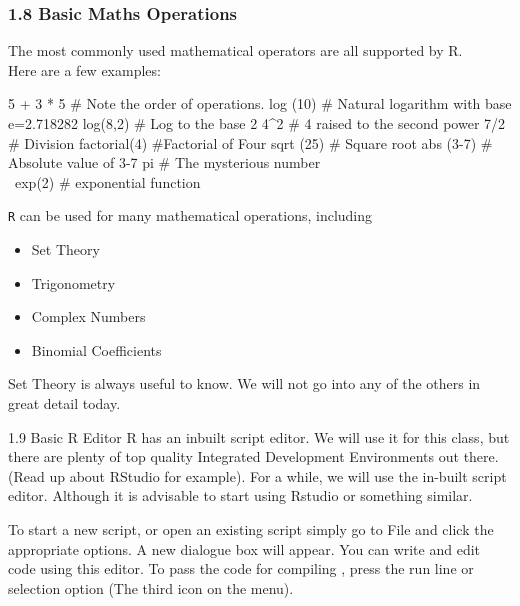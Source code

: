  
 \frametitle{1.8 Basic Maths Operations}
 The most commonly used mathematical operators are all supported by R. \\Here are a few
 examples:
 
 \begin{semiverbatim}
 5 + 3 * 5 # Note the order of operations.
 log (10) # Natural logarithm with base e=2.718282
 log(8,2) # Log to the base 2
 4^2 # 4 raised to the second power
 7/2 # Division
 factorial(4) #Factorial of Four
 sqrt (25) # Square root
 abs (3-7) # Absolute value of 3-7
 pi # The mysterious number \\\
 exp(2) # exponential function
 \end{semiverbatim}
 
 
 
 \texttt{R} can be used for many mathematical operations, including
 
 \begin{itemize}
 \item Set Theory
 \item Trigonometry
 \item Complex Numbers
 \item Binomial Coefficients
 \end{itemize}
 Set Theory is always useful to know. We will not go into any of the others in great detail today.
 
 
 
 1.9 Basic R Editor
 R has an inbuilt script editor. We will use it for this class, but there are plenty of top quality
 Integrated Development Environments out there. (Read up about RStudio for example).
 For a while, we will use the in-built script editor. Although it is advisable to start using Rstudio or something similar.
 
 
 
 
 
 To start a new script, or open an existing script simply go to File and click the appropriate
 options. A new dialogue box will appear. You can write and edit code using this editor.
 To pass the code for compiling , press the run line or selection option (The third icon
 on the menu).
 
 
 
